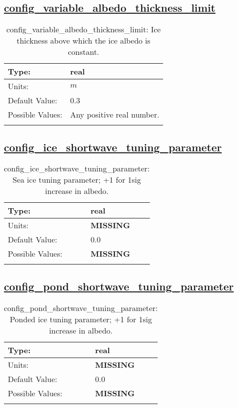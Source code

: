 \subsection[config\_variable\_albedo\_thickness\_limit]{\hyperref[sec:nm_tab_shortwave]{config\_variable\_albedo\_thickness\_limit}}
\label{subsec:nm_sec_config_variable_albedo_thickness_limit}
\begin{center}
\begin{longtable}{| p{2.0in} || p{4.0in} |}
    \hline
    Type: & real \\
    \hline
    Units: & $m$ \\
    \hline
    Default Value: & 0.3 \\
    \hline
    Possible Values: & Any positive real number. \\
    \hline
    \caption{config\_variable\_albedo\_thickness\_limit: Ice thickness above which the ice albedo is constant.}
\end{longtable}
\end{center}
\subsection[config\_ice\_shortwave\_tuning\_parameter]{\hyperref[sec:nm_tab_shortwave]{config\_ice\_shortwave\_tuning\_parameter}}
\label{subsec:nm_sec_config_ice_shortwave_tuning_parameter}
\begin{center}
\begin{longtable}{| p{2.0in} || p{4.0in} |}
    \hline
    Type: & real \\
    \hline
    Units: & {\bf \color{red} MISSING} \\
    \hline
    Default Value: & 0.0 \\
    \hline
    Possible Values: & {\bf \color{red} MISSING} \\
    \hline
    \caption{config\_ice\_shortwave\_tuning\_parameter: Sea ice tuning parameter; +1 for 1sig increase in albedo.}
\end{longtable}
\end{center}
\subsection[config\_pond\_shortwave\_tuning\_parameter]{\hyperref[sec:nm_tab_shortwave]{config\_pond\_shortwave\_tuning\_parameter}}
\label{subsec:nm_sec_config_pond_shortwave_tuning_parameter}
\begin{center}
\begin{longtable}{| p{2.0in} || p{4.0in} |}
    \hline
    Type: & real \\
    \hline
    Units: & {\bf \color{red} MISSING} \\
    \hline
    Default Value: & 0.0 \\
    \hline
    Possible Values: & {\bf \color{red} MISSING} \\
    \hline
    \caption{config\_pond\_shortwave\_tuning\_parameter: Ponded ice tuning parameter; +1 for 1sig increase in albedo.}
\end{longtable}
\end{center}
